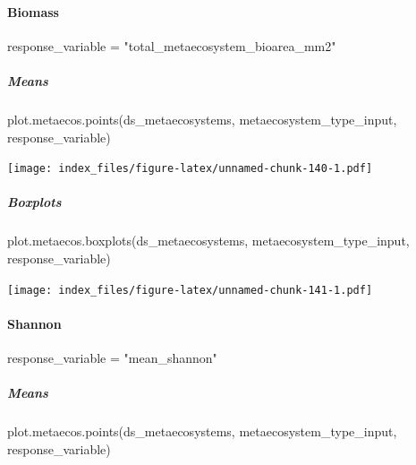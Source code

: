 \documentclass[
]{article}
\newenvironment{Shaded}{\begin{snugshade}}{\end{snugshade}}
\newcommand{\FunctionTok}[1]{\textcolor[rgb]{0.00,0.00,0.00}{#1}}
\newcommand{\NormalTok}[1]{#1}
\newcommand{\OtherTok}[1]{\textcolor[rgb]{0.56,0.35,0.01}{#1}}
\newcommand{\StringTok}[1]{\textcolor[rgb]{0.31,0.60,0.02}{#1}}
\begin{document}
\hypertarget{biomass}{%
\paragraph{Biomass}\label{biomass}}

\begin{Shaded}
\begin{Highlighting}[]
\NormalTok{response\_variable }\OtherTok{=} \StringTok{"total\_metaecosystem\_bioarea\_mm2"}
\end{Highlighting}
\end{Shaded}

\hypertarget{means}{%
\subparagraph{Means}\label{means}}

\begin{Shaded}
\begin{Highlighting}[]
\FunctionTok{plot.metaecos.points}\NormalTok{(ds\_metaecosystems, metaecosystem\_type\_input,}
\NormalTok{                     response\_variable)}
\end{Highlighting}
\end{Shaded}

\texttt{[image: index\_files/figure-latex/unnamed-chunk-140-1.pdf]}

\hypertarget{boxplots}{%
\subparagraph{Boxplots}\label{boxplots}}

\begin{Shaded}
\begin{Highlighting}[]
\FunctionTok{plot.metaecos.boxplots}\NormalTok{(ds\_metaecosystems, metaecosystem\_type\_input,}
\NormalTok{                       response\_variable)}
\end{Highlighting}
\end{Shaded}

\texttt{[image: index\_files/figure-latex/unnamed-chunk-141-1.pdf]}

\hypertarget{shannon}{%
\paragraph{Shannon}\label{shannon}}

\begin{Shaded}
\begin{Highlighting}[]
\NormalTok{response\_variable }\OtherTok{=} \StringTok{"mean\_shannon"}
\end{Highlighting}
\end{Shaded}

\hypertarget{means-1}{%
\subparagraph{Means}\label{means-1}}

\begin{Shaded}
\begin{Highlighting}[]
\FunctionTok{plot.metaecos.points}\NormalTok{(ds\_metaecosystems, metaecosystem\_type\_input,}
\NormalTok{                     response\_variable)}
\end{Highlighting}
\end{Shaded}
\end{document}
